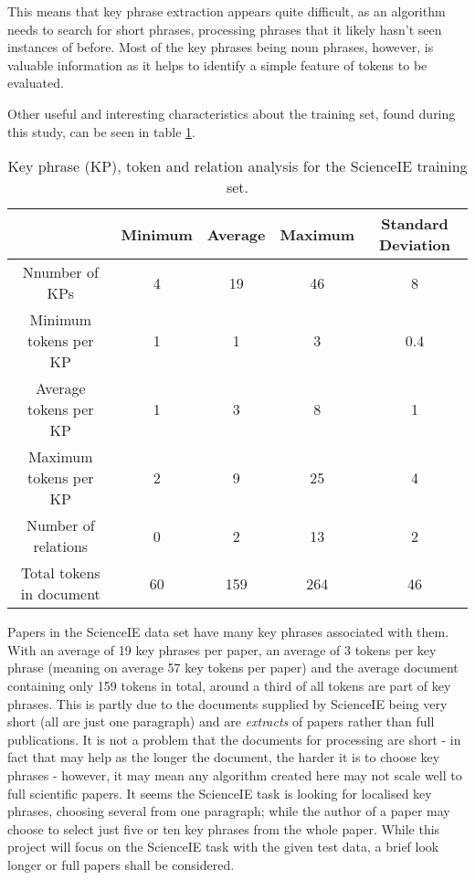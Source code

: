 This means that key phrase extraction appears quite difficult, as an algorithm needs to search for short phrases, processing phrases that it likely hasn't seen instances of before. Most of the key phrases being noun phrases, however, is valuable information as it helps to identify a simple feature of tokens to be evaluated.

Other useful and interesting characteristics about the training set, found during this study, can be seen in table \ref{table:traininganalysis}. 

\begin{table}
	\centering
	\begin{tabular}{ c | c c c c }
		& \textbf{Minimum} & \textbf{Average} & \textbf{Maximum} & \textbf{Standard Deviation} \\
		\hline
		Nnumber of KPs & 4 & 19 & 46 & 8 \\
		Minimum tokens per KP & 1 & 1 & 3 & 0.4 \\
		Average tokens per KP & 1 & 3 & 8 & 1 \\
		Maximum tokens per KP & 2 & 9 & 25 & 4 \\
		Number of relations & 0 & 2 & 13 & 2 \\
		Total tokens in document & 60 & 159 & 264 & 46
	\end{tabular}
	\caption[ScienceIE Training Set Analysis]{Key phrase (KP), token and relation analysis for the ScienceIE training set.}
	\label{table:traininganalysis}
\end{table}

Papers in the ScienceIE data set have many key phrases associated with them. With an average of 19 key phrases per paper, an average of 3 tokens per key phrase (meaning on average 57 key tokens per paper) and the average document containing only 159 tokens in total, around a third of all tokens are part of key phrases. This is partly due to the documents supplied by ScienceIE being very short (all are just one paragraph) and are \textit{extracts} of papers rather than full publications. It is not a problem that the documents for processing are short - in fact that may help as the longer the document, the harder it is to choose key phrases \cite{Hasan2014} - however, it may mean any algorithm created here may not scale well to full scientific papers. It seems the ScienceIE task is looking for localised key phrases, choosing several from one paragraph; while the author of a paper may choose to select just five or ten key phrases from the whole paper. While this project will focus on the ScienceIE task with the given test data, a brief look longer or full papers shall be considered.

